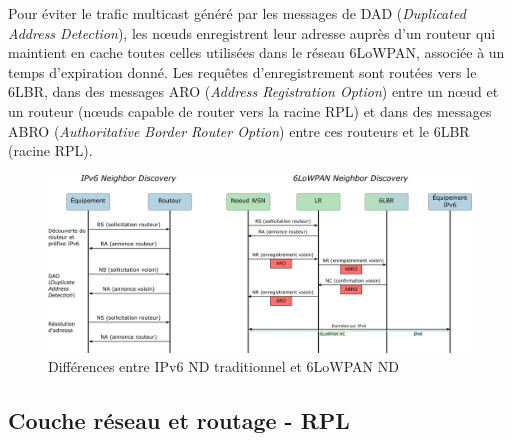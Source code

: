 \documentclass[]{report}
\begin{document}
\par Pour éviter le trafic multicast généré par les messages de DAD (\textit{Duplicated Address Detection}), les nœuds enregistrent leur adresse auprès d'un routeur qui maintient en cache toutes celles utilisées dans le réseau 6LoWPAN, associée à un temps d'expiration donné. Les requêtes d'enregistrement sont routées vers le 6LBR, dans des messages ARO (\textit{Address Registration Option}) entre un nœud et un routeur (nœuds capable de router vers la racine RPL) et dans des messages ABRO (\textit{Authoritative Border Router Option}) entre ces routeurs et le 6LBR (racine RPL). 

\vspace{0.4cm}

	\begin{figure}[!h]
	\centering
	\includegraphics[width=\linewidth]{6LoWPAN-ND}
	\caption{Différences entre IPv6 ND traditionnel et 6LoWPAN ND}
	\label{fig:6LoWPAN-ND}
	\end{figure}


\newpage	
	
	\subsection{Couche réseau et routage - RPL}
	\label{RPL}
	
\end{document}
